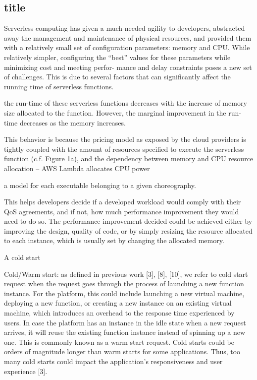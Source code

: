 \subsection{title}


Serverless computing has given a much-needed agility to
developers, abstracted away the management and maintenance
of physical resources, and provided them with a relatively
small set of conﬁguration parameters: memory and CPU.
While relatively simpler, conﬁguring the “best” values for
these parameters while minimizing cost and meeting perfor-
mance and delay constraints poses a new set of challenges.
This is due to several factors that can signiﬁcantly aﬀect the
running time of serverless functions.


the run-time of these serverless
functions decreases with the increase of memory size allocated
to the function. However, the marginal improvement in the
run-time decreases as the memory increases.

This behavior
is because the pricing model as exposed by the cloud providers
is tightly coupled with the amount of resources speciﬁed
to execute the serverless function (c.f. Figure 1a), and the
dependency between memory and CPU resource allocation –
AWS Lambda allocates CPU power


a model for each executable belonging to a given choreography.



This helps developers decide if a developed
workload would comply with their QoS agreements, and if
not, how much performance improvement they would need
to do so. The performance improvement decided could be
achieved either by improving the design, quality of code, or
by simply resizing the resource allocated to each instance,
which is usually set by changing the allocated memory.


A cold start 

Cold/Warm start: as deﬁned in previous work [3], [8],
[10], we refer to cold start request when the request goes
through the process of launching a new function instance.
For the platform, this could include launching a new virtual
machine, deploying a new function, or creating a new
instance on an existing virtual machine, which introduces an
overhead to the response time experienced by users. In case
the platform has an instance in the idle state when a new
request arrives, it will reuse the existing function instance
instead of spinning up a new one. This is commonly known
as a warm start request. Cold starts could be orders of
magnitude longer than warm starts for some applications.
Thus, too many cold starts could impact the application’s
responsiveness and user experience [3].



